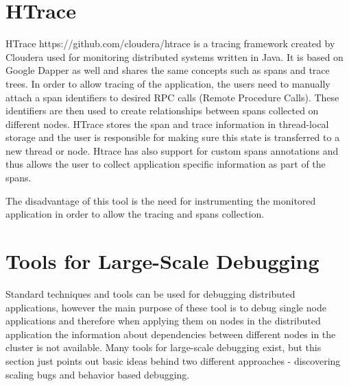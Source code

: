  \section{HTrace}
 \label{htrace}
 HTrace https://github.com/cloudera/htrace is a tracing framework created by Cloudera used for monitoring distributed systems written in Java. It is based on Google Dapper as well and shares the same concepts such as spans and trace trees. In order to allow tracing of the application, the users need to manually attach a span identifiers to desired RPC calls (Remote Procedure Calls). These identifiers are then used to create relationships between spans collected on different nodes. HTrace stores the span and trace information in thread-local storage and the user is responsible for making sure this state is transferred to a new thread or node. Htrace has also support for custom spans annotations and thus allows the user to collect application specific information as part of the spans. 
 
 The disadvantage of this tool is the need for instrumenting the monitored application in order to allow the tracing and spans collection.
\section{Tools for Large-Scale Debugging}
Standard techniques and tools can be used for debugging distributed applications, however the main purpose of these tool is to debug single node applications and therefore when applying them on nodes in the distributed application the information about dependencies between different nodes in the cluster is not available. Many tools for large-scale debugging exist, but this section just points out basic ideas behind two different approaches - discovering scaling bugs and behavior based debugging. 

